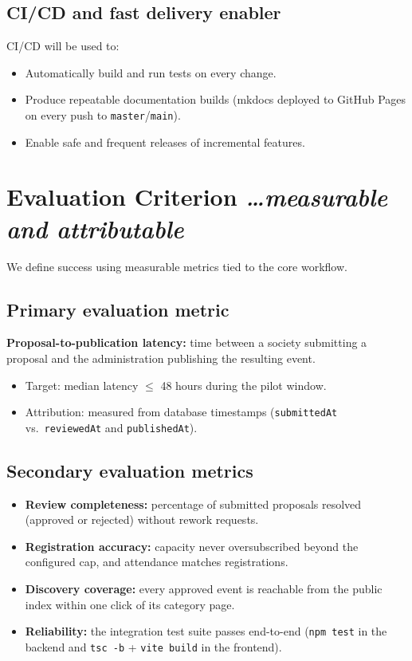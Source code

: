 \documentclass[11pt,a4paper]{article}
\newcommand{\BvrHint}[1]{%
  {\normalfont\normalsize\itshape\hfill #1}}
\begin{document}
\subsection{CI/CD and fast delivery enabler}
CI/CD will be used to:
\begin{itemize}[leftmargin=0.7cm]
    \item Automatically build and run tests on every
      change.
    \item Produce repeatable documentation builds
      (mkdocs deployed to GitHub Pages on every push to
      \texttt{master}/\texttt{main}).
    \item Enable safe and frequent releases of
      incremental features.
\end{itemize}

\section{Evaluation Criterion %
\BvrHint{\ldots measurable and attributable}}
We define success using measurable metrics tied to the
core workflow.

\subsection{Primary evaluation metric}
\textbf{Proposal-to-publication latency:} time between a
society submitting a proposal and the administration
publishing the resulting event.
\begin{itemize}[leftmargin=0.7cm]
    \item Target: median latency $\le$ 48 hours during the
      pilot window.
    \item Attribution: measured from database timestamps
      (\texttt{submittedAt} vs.\ \texttt{reviewedAt} and
      \texttt{publishedAt}).
\end{itemize}

\subsection{Secondary evaluation metrics}
\begin{itemize}[leftmargin=0.7cm]
    \item \textbf{Review completeness:} percentage of
      submitted proposals resolved (approved or
      rejected) without rework requests.
    \item \textbf{Registration accuracy:} capacity never
      oversubscribed beyond the configured cap, and
      attendance matches registrations.
    \item \textbf{Discovery coverage:} every approved
      event is reachable from the public index within one
      click of its category page.
    \item \textbf{Reliability:} the integration test
      suite passes end-to-end (\texttt{npm test} in the
      backend and \texttt{tsc -b} + \texttt{vite build}
      in the frontend).
\end{itemize}
\end{document}
